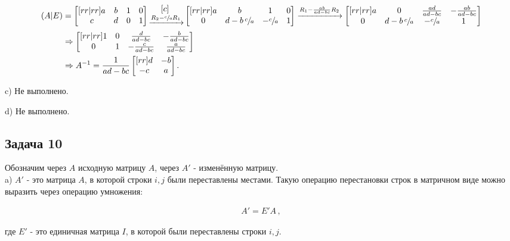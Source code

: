 \documentclass[a4paper,11pt]{article}
\begin{document}
\begin{align*}
(A|E) & = 
\begin{bmatrix}[rr|rr]
   a & b &  1 &  0 \\
   c & d &  0 &  1
\end{bmatrix}
\begin{matrix}[c] ~ \\ \xrightarrow{R_2-\sfrac{c}{a}R_1} \end{matrix}
\begin{bmatrix}[rr|rr]
   a & b                &  1             &  0 \\
   0 & d - b\,\sfrac{c}{a}  &  -\sfrac{c}{a} &  1
\end{bmatrix}
\xrightarrow{R_1-\frac{ab}{ad-bc}R_2} 
\begin{bmatrix}[rr|rr]
   a & 0                    &  \frac{ad}{ad-bc}  &  -\frac{ab}{ad-bc} \\
   0 & d - b\,\sfrac{c}{a}  &  -\sfrac{c}{a}            &  1
\end{bmatrix}
\\
& \Rightarrow
\begin{bmatrix}[rr|rr]
   1 & 0  &  \frac{d}{ad-bc}  &  -\frac{b}{ad-bc} \\
   0 & 1  & -\frac{c}{ad-bc}  &  \frac{a}{ad-bc}
\end{bmatrix}
\\
& \Rightarrow
A^{-1} = 
\frac{1}{ad-bc}
\begin{bmatrix}[rr]
   d & -b \\
  -c &  a
\end{bmatrix}.
\end{align*}

c) Не выполнено.

d) Не выполнено.

\subsection{Задача 10}

Обозначим через $A$ исходную матрицу $A$, через $A'$ - изменённую матрицу.\\

a) $A'$ - это матрица $A$, в которой строки $i,j$ были переставлены местами. Такую операцию перестановки строк в матричном виде можно выразить через операцию умножения:

\begin{align*}
  A' = E'A \, ,
\end{align*}

где $E'$ - это единичная матрица $I$, в которой были переставлены строки $i,j$.
\end{document}
